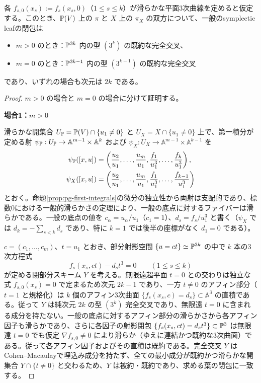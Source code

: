 \begin{proposition}\label{prop:pg-leaf-closure}
各 $f_{s,0}(x_s):=f_s(x_s,0)$（$1\le s\le k$）が滑らかな平面3次曲線を定めると仮定する。このとき、$\mathbb P(V)$ 上の $\pi$ と $X$ 上の $\pi_X$ の双方について、一般のsymplectic leafの閉包は
\begin{itemize}
  \item $m>0$ のとき：$\mathbb P^{3k}$ 内の型 $(3^k)$ の既約な完全交叉、
  \item $m=0$ のとき：$\mathbb P^{3k-1}$ 内の型 $(3^{k-1})$ の既約な完全交叉
\end{itemize}
であり、いずれの場合も次元は $2k$ である。
\end{proposition}
\begin{proof}
$m>0$ の場合と $m=0$ の場合に分けて証明する。

\par\medskip\noindent\textbf{場合1：$m>0$}\par\nobreak\smallskip
滑らかな開集合 $U_{\mathbb P}=\mathbb P(V)\cap\{u_1\ne0\}$ と $U_X=X\cap\{u_1\ne0\}$ 上で、第一積分が定める射 $\psi_{\mathbb P}:U_{\mathbb P}\to\mathbb A^{m-1}\times\mathbb A^k$ および $\psi_X:U_X\to\mathbb A^{m-1}\times\mathbb A^{k-1}$ を
\begin{equation}\label{eq:pg-affine-first-integrals}
\begin{aligned}
\psi_{\mathbb P}([x,u])&=
\left(\frac{u_2}{u_1},\ldots,\frac{u_m}{u_1},
  \frac{f_1}{u_1^3},\ldots,\frac{f_k}{u_1^3}\right),\\
\psi_X([x,u])&=
\left(\frac{u_2}{u_1},\ldots,\frac{u_m}{u_1},
  \frac{f_1}{u_1^3},\ldots,\frac{f_{k-1}}{u_1^3}\right)
\end{aligned}
\end{equation}
とおく。命題\ref{prop:pg-first-integrals}の微分の独立性から両射は支配的であり、標数0における一般的滑らかさの定理により、一般の底点に対するファイバーは滑らかである。一般の底点の値を $c_\alpha=u_\alpha/u_1$（$c_1=1$）、$d_s=f_s/u_1^3$ と書く（$\psi_X$ では $d_k=-\sum_{s<k}d_s$ であり、特に $k=1$ では後半の座標がなく $d_1=0$ である）。

$c=(c_1,\ldots,c_m)$、$t=u_1$ とおき、部分射影空間 $\{u=ct\}\simeq\mathbb P^{3k}$ の中で $k$ 本の3次方程式
\begin{equation}\label{eq:pg-leaf-closure-equations}
  f_s(x_s,ct)-d_st^3=0\qquad(1\leq s\leq k)
\end{equation}
が定める閉部分スキーム $Y$ を考える。無限遠超平面 $t=0$ との交わりは独立な式 $f_{s,0}(x_s)=0$ で定まるため次元 $2k-1$ であり、一方 $t\ne0$ のアフィン部分（$t=1$ と規格化）は $k$ 個のアフィン3次曲面 $\{f_s(x_s,c)=d_s\}\subset\mathbb A^3$ の直積である。従って $Y$ は純次元 $2k$ の型 $(3^k)$ 完全交叉であり、無限遠 $t=0$ に含まれる成分を持たない。一般の底点に対するアフィン部分の滑らかさから各アフィン因子も滑らかであり、さらに各因子の射影閉包 $\{f_s(x_s,ct)=d_st^3\}\subset\mathbb P^3$ は無限遠 $t=0$ でも仮定 $\nabla f_{s,0}\ne0$ により滑らか（ゆえに連結かつ既約な3次曲面）である。従って各アフィン因子およびその直積は既約である。完全交叉 $Y$ はCohen--Macaulayで埋込み成分を持たず、全ての最小成分が既約かつ滑らかな開集合 $Y\cap\{t\ne0\}$ と交わるため、$Y$ は被約・既約であり、求める葉の閉包に一致する。


\end{proof}
